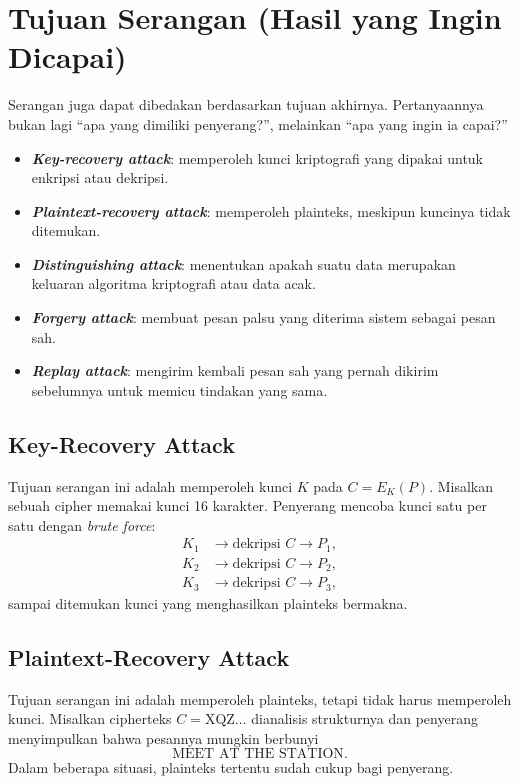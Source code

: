 \section{Tujuan Serangan (Hasil yang Ingin Dicapai)}
\label{sec:tujuan-serangan}

Serangan juga dapat dibedakan berdasarkan tujuan akhirnya. Pertanyaannya bukan
lagi ``apa yang dimiliki penyerang?'', melainkan ``apa yang ingin ia capai?''

\begin{itemize}
    \item \textbf{\textit{Key-recovery attack}}: memperoleh kunci kriptografi
          yang dipakai untuk enkripsi atau dekripsi.
    \item \textbf{\textit{Plaintext-recovery attack}}: memperoleh plainteks,
          meskipun kuncinya tidak ditemukan.
    \item \textbf{\textit{Distinguishing attack}}: menentukan apakah suatu data
          merupakan keluaran algoritma kriptografi atau data acak.
    \item \textbf{\textit{Forgery attack}}: membuat pesan palsu yang diterima
          sistem sebagai pesan sah.
    \item \textbf{\textit{Replay attack}}: mengirim kembali pesan sah yang pernah
          dikirim sebelumnya untuk memicu tindakan yang sama.
\end{itemize}

\subsection{Key-Recovery Attack}

Tujuan serangan ini adalah memperoleh kunci $K$ pada $C = E_K(P)$. Misalkan
sebuah cipher memakai kunci 16 karakter. Penyerang mencoba kunci satu per satu
dengan \textit{brute force}:
\begin{align*}
    K_1 &\to \text{dekripsi } C \to P_1, \\
    K_2 &\to \text{dekripsi } C \to P_2, \\
    K_3 &\to \text{dekripsi } C \to P_3,
\end{align*}
sampai ditemukan kunci yang menghasilkan plainteks bermakna.

\subsection{Plaintext-Recovery Attack}

Tujuan serangan ini adalah memperoleh plainteks, tetapi tidak harus memperoleh
kunci. Misalkan cipherteks $C = \text{XQZ}\dots$ dianalisis strukturnya dan
penyerang menyimpulkan bahwa pesannya mungkin berbunyi
\[
    \text{MEET AT THE STATION}.
\]
Dalam beberapa situasi, plainteks tertentu sudah cukup bagi penyerang.

